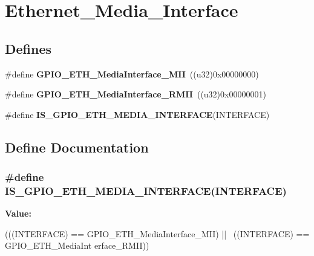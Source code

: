 \hypertarget{group__Ethernet__Media__Interface}{
\section{Ethernet\_\-Media\_\-Interface}
\label{group__Ethernet__Media__Interface}
}
\subsection*{Defines}
\begin{DoxyCompactItemize}
\item 
\hypertarget{group__Ethernet__Media__Interface_gae11ff25c61c4f22f55118f9f88f6d465}{
\#define {\bfseries GPIO\_\-ETH\_\-MediaInterface\_\-MII}~((u32)0x00000000)}
\label{group__Ethernet__Media__Interface_gae11ff25c61c4f22f55118f9f88f6d465}

\item 
\hypertarget{group__Ethernet__Media__Interface_ga5ee3d057ee58149b1d1abdacfacd4a4e}{
\#define {\bfseries GPIO\_\-ETH\_\-MediaInterface\_\-RMII}~((u32)0x00000001)}
\label{group__Ethernet__Media__Interface_ga5ee3d057ee58149b1d1abdacfacd4a4e}

\item 
\#define {\bfseries IS\_\-GPIO\_\-ETH\_\-MEDIA\_\-INTERFACE}(INTERFACE)
\end{DoxyCompactItemize}


\subsection{Define Documentation}
\hypertarget{group__Ethernet__Media__Interface_gaaba662c046aed61cb28aa10918bfd4c4}{
\subsubsection[{IS\_\-GPIO\_\-ETH\_\-MEDIA\_\-INTERFACE}]{\setlength{\rightskip}{0pt plus 5cm}\#define IS\_\-GPIO\_\-ETH\_\-MEDIA\_\-INTERFACE(INTERFACE)}}
\label{group__Ethernet__Media__Interface_gaaba662c046aed61cb28aa10918bfd4c4}
{\bfseries Value:}
\begin{DoxyCode}
(((INTERFACE) == GPIO_ETH_MediaInterface_MII) || \
                                                ((INTERFACE) == GPIO_ETH_MediaInt
      erface_RMII))
\end{DoxyCode}
